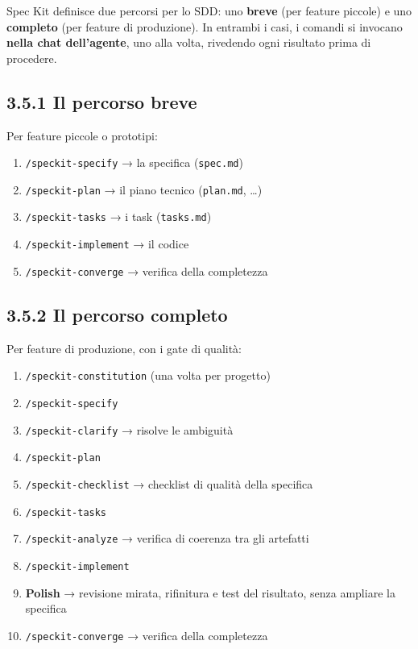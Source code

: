 \documentclass[
  italian,
  10pt,
]{book}
\providecommand{\tightlist}{%
  \setlength{\itemsep}{0pt}\setlength{\parskip}{0pt}}
\begin{document}
Spec Kit definisce due percorsi per lo SDD: uno \textbf{breve} (per
feature piccole) e uno \textbf{completo} (per feature di produzione). In
entrambi i casi, i comandi si invocano \textbf{nella chat dell'agente},
uno alla volta, rivedendo ogni risultato prima di procedere.

\subsection{3.5.1 Il percorso breve}\label{il-percorso-breve}

Per feature piccole o prototipi:

\begin{enumerate}
\def\labelenumi{\arabic{enumi}.}
\tightlist
\item
  \texttt{/speckit-specify} → la specifica (\texttt{spec.md})
\item
  \texttt{/speckit-plan} → il piano tecnico (\texttt{plan.md}, \ldots)
\item
  \texttt{/speckit-tasks} → i task (\texttt{tasks.md})
\item
  \texttt{/speckit-implement} → il codice
\item
  \texttt{/speckit-converge} → verifica della completezza
\end{enumerate}

\subsection{3.5.2 Il percorso completo}\label{il-percorso-completo}

Per feature di produzione, con i gate di qualità:

\begin{enumerate}
\def\labelenumi{\arabic{enumi}.}
\tightlist
\item
  \texttt{/speckit-constitution} (una volta per progetto)
\item
  \texttt{/speckit-specify}
\item
  \texttt{/speckit-clarify} → risolve le ambiguità
\item
  \texttt{/speckit-plan}
\item
  \texttt{/speckit-checklist} → checklist di qualità della specifica
\item
  \texttt{/speckit-tasks}
\item
  \texttt{/speckit-analyze} → verifica di coerenza tra gli artefatti
\item
  \texttt{/speckit-implement}
\item
  \textbf{Polish} → revisione mirata, rifinitura e test del risultato,
  senza ampliare la specifica
\item
  \texttt{/speckit-converge} → verifica della completezza
\end{enumerate}
\end{document}
